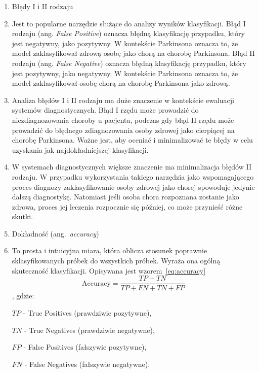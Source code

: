 \begin{enumerate}[label={\alph*)}]
    \item Błędy I i II rodzaju
    \item [] Jest to popularne narzędzie służące do analizy wyników klasyfikacji.
    Błąd I rodzaju (ang. \emph{False Positive}) oznacza błędną klasyfikację przypadku, który jest negatywny, jako pozytywny.
    W kontekście Parkinsona oznacza to, że model zaklasyfikował zdrową osobę jako chorą na chorobę Parkinsona.
    Błąd II rodzaju (ang. \emph{False Negative}) oznacza błędną klasyfikację przypadku, który jest pozytywny, jako negatywny.
    W kontekście Parkinsona oznacza to, że model zaklasyfikował osobę chorą na chorobę Parkinsona jako zdrową.

    \item [] Analiza błędów I i II rodzaju ma duże znaczenie w kontekście ewaluacji systemów diagnostycznych.
    Błąd I rzędu może prowadzić do niezdiagnozowania choroby u pacjenta, podczas gdy błąd II rzędu może prowadzić do błędnego zdiagnozowania osoby zdrowej jako cierpiącej na chorobę Parkinsona.
    Ważne jest, aby oceniać i minimalizować te błędy w celu uzyskania jak najdokładniejszej klasyfikacji.

    \item [] W systemach diagnostycznych większe znaczenie ma minimalizacja błędów II rodzaju.
    W przypadku wykorzystania takiego narzędzia jako wspomagającego proces diagnozy zaklasyfikowanie osoby zdrowej jako chorej spowoduje jedynie dalszą diagnostykę.
    Natomiast jeśli osoba chora rozpoznana zostanie jako zdrowa, proces jej leczenia rozpocznie się później, co może przynieść różne skutki.
	\item Dokładność (ang.~\emph{accuracy})
    \item [] To prosta i intuicyjna miara, która oblicza stosunek poprawnie sklasyfikowanych próbek do wszystkich próbek.
    Wyraża ona ogólną skuteczność klasyfikacji.
    Opisywana jest wzorem~\ref{eq:accuracy}
    \begin{equation}
        \text{Accuracy} = \frac{TP + TN}{TP + FN + TN + FP}
        \label{eq:accuracy}
    \end{equation}
    , gdzie:

\quad$TP$ - True Positives (prawdziwie pozytywne),

\quad$TN$ - True Negatives (prawdziwie negatywne),

\quad$FP$ - False Positives (fałszywie pozytywne),

\quad$FN$ - False Negatives (fałszywie negatywne).


\end{enumerate}
